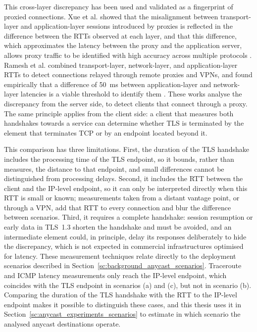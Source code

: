 This cross-layer discrepancy has been used and validated as a fingerprint of proxied connections. Xue et al. showed that the misalignment between transport-layer and application-layer sessions introduced by proxies is reflected in the difference between the RTTs observed at each layer, and that this difference, which approximates the latency between the proxy and the application server, allows proxy traffic to be identified with high accuracy across multiple protocols \cite{Xue2025TheTraffic}. Ramesh et al. combined transport-layer, network-layer, and application-layer RTTs to detect connections relayed through remote proxies and VPNs, and found empirically that a difference of 50~ms between application-layer and network-layer latencies is a viable threshold to identify them \cite{Ramesh2024CalcuLatency:Abuse}. These works analyse the discrepancy from the server side, to detect clients that connect through a proxy. The same principle applies from the client side: a client that measures both handshakes towards a service can determine whether TLS is terminated by the element that terminates TCP or by an endpoint located beyond it.

This comparison has three limitations. First, the duration of the TLS handshake includes the processing time of the TLS endpoint, so it bounds, rather than measures, the distance to that endpoint, and small differences cannot be distinguished from processing delays. Second, it includes the RTT between the client and the IP-level endpoint, so it can only be interpreted directly when this RTT is small or known; measurements taken from a distant vantage point, or through a VPN, add that RTT to every connection and blur the difference between scenarios. Third, it requires a complete handshake: session resumption or early data in TLS~1.3 shorten the handshake and must be avoided, and an intermediate element could, in principle, delay its responses deliberately to hide the discrepancy, which is not expected in commercial infrastructures optimised for latency. These measurement techniques relate directly to the deployment scenarios described in Section~\ref{sc:background_anycast_scenarios}. Traceroute and ICMP latency measurements only reach the IP-level endpoint, which coincides with the TLS endpoint in scenarios (a) and (c), but not in scenario (b). Comparing the duration of the TLS handshake with the RTT to the IP-level endpoint makes it possible to distinguish these cases, and this thesis uses it in Section~\ref{sc:anycast_experiments_scenarios} to estimate in which scenario the analysed anycast destinations operate.

